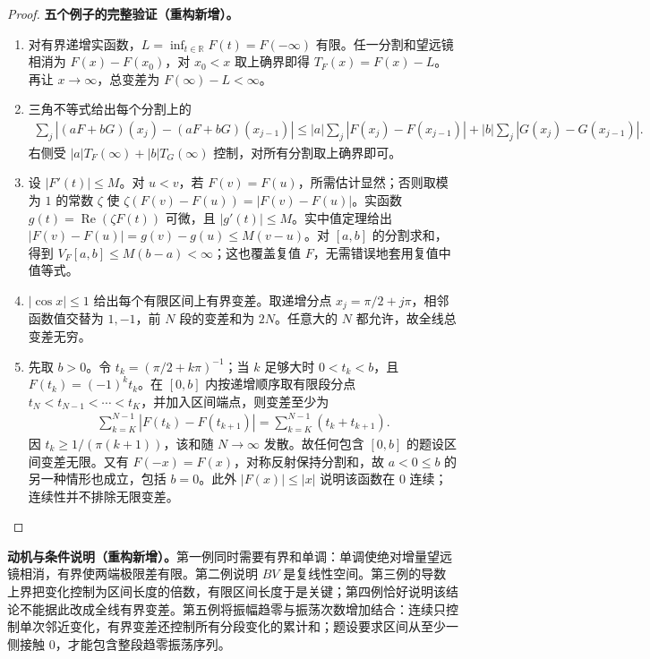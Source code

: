 \documentclass[../../main.tex]{subfiles}%
\begin{document}
\begin{proof}
\textbf{五个例子的完整验证（重构新增）。}
\begin{enumerate}
\item 对有界递增实函数，$L=\inf_{t\in\mathbb R}F(t)=F(-\infty)$ 有限。任一分割和望远镜相消为 $F(x)-F(x_0)$，对 $x_0<x$ 取上确界即得 $T_F(x)=F(x)-L$。再让 $x\to\infty$，总变差为 $F(\infty)-L<\infty$。
\item 三角不等式给出每个分割上的
\begin{align*}
\sum_j|(aF+bG)(x_j)-(aF+bG)(x_{j-1})|
\le |a|\sum_j|F(x_j)-F(x_{j-1})|+|b|\sum_j|G(x_j)-G(x_{j-1})|.
\end{align*}
右侧受 $|a|T_F(\infty)+|b|T_G(\infty)$ 控制，对所有分割取上确界即可。
\item 设 $|F'(t)|\le M$。对 $u<v$，若 $F(v)=F(u)$，所需估计显然；否则取模为 $1$ 的常数 $\zeta$ 使 $\zeta(F(v)-F(u))=|F(v)-F(u)|$。实函数 $g(t)=\operatorname{Re}(\zeta F(t))$ 可微，且 $|g'(t)|\le M$。实中值定理给出 $|F(v)-F(u)|=g(v)-g(u)\le M(v-u)$。对 $[a,b]$ 的分割求和，得到 $V_F[a,b]\le M(b-a)<\infty$；这也覆盖复值 $F$，无需错误地套用复值中值等式。
\item $|\cos x|\le1$ 给出每个有限区间上有界变差。取递增分点 $x_j=\pi/2+j\pi$，相邻函数值交替为 $1,-1$，前 $N$ 段的变差和为 $2N$。任意大的 $N$ 都允许，故全线总变差无穷。
\item 先取 $b>0$。令 $t_k=(\pi/2+k\pi)^{-1}$；当 $k$ 足够大时 $0<t_k<b$，且 $F(t_k)=(-1)^kt_k$。在 $[0,b]$ 内按递增顺序取有限段分点 $t_N<t_{N-1}<\cdots<t_K$，并加入区间端点，则变差至少为
\begin{align*}
\sum_{k=K}^{N-1}|F(t_k)-F(t_{k+1})|
=\sum_{k=K}^{N-1}(t_k+t_{k+1}).
\end{align*}
因 $t_k\ge1/(\pi(k+1))$，该和随 $N\to\infty$ 发散。故任何包含 $[0,b]$ 的题设区间变差无限。又有 $F(-x)=F(x)$，对称反射保持分割和，故 $a<0\le b$ 的另一种情形也成立，包括 $b=0$。此外 $|F(x)|\le|x|$ 说明该函数在 $0$ 连续；连续性并不排除无限变差。
\end{enumerate}
\end{proof}
\begin{remark}
\textbf{动机与条件说明（重构新增）。}第一例同时需要有界和单调：单调使绝对增量望远镜相消，有界使两端极限差有限。第二例说明 $BV$ 是复线性空间。第三例的导数上界把变化控制为区间长度的倍数，有限区间长度于是关键；第四例恰好说明该结论不能据此改成全线有界变差。第五例将振幅趋零与振荡次数增加结合：连续只控制单次邻近变化，有界变差还控制所有分段变化的累计和；题设要求区间从至少一侧接触 $0$，才能包含整段趋零振荡序列。
\end{remark}
\end{document}

